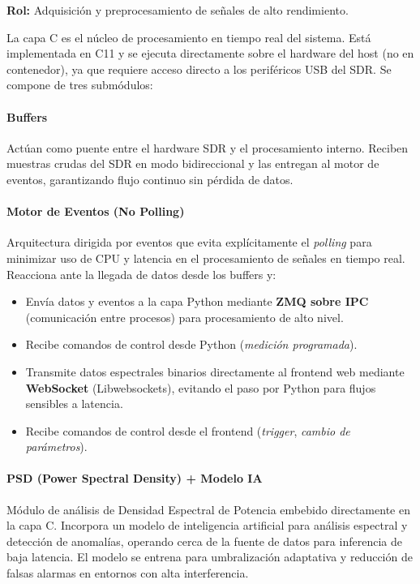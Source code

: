 \documentclass[12pt,a4paper]{article}
\begin{document}
\textbf{Rol:} Adquisición y preprocesamiento de señales de alto rendimiento.

La capa C es el núcleo de procesamiento en tiempo real del sistema. Está implementada en C11 y se ejecuta directamente sobre el hardware del host (no en contenedor), ya que requiere acceso directo a los periféricos USB del SDR. Se compone de tres submódulos:

\paragraph{Buffers}
Actúan como puente entre el hardware SDR y el procesamiento interno. Reciben muestras crudas del SDR en modo bidireccional y las entregan al motor de eventos, garantizando flujo continuo sin pérdida de datos.

\paragraph{Motor de Eventos (No Polling)}
Arquitectura dirigida por eventos que evita explícitamente el \textit{polling} para minimizar uso de CPU y latencia en el procesamiento de señales en tiempo real. Reacciona ante la llegada de datos desde los buffers y:
\begin{itemize}
  \item Envía datos y eventos a la capa Python mediante \textbf{ZMQ sobre IPC} (comunicación entre procesos) para procesamiento de alto nivel.
  \item Recibe comandos de control desde Python (\textit{medición programada}).
  \item Transmite datos espectrales binarios directamente al frontend web mediante \textbf{WebSocket} (Libwebsockets), evitando el paso por Python para flujos sensibles a latencia.
  \item Recibe comandos de control desde el frontend (\textit{trigger}, \textit{cambio de parámetros}).
\end{itemize}

\paragraph{PSD (Power Spectral Density) + Modelo IA}
Módulo de análisis de Densidad Espectral de Potencia embebido directamente en la capa C. Incorpora un modelo de inteligencia artificial para análisis espectral y detección de anomalías, operando cerca de la fuente de datos para inferencia de baja latencia. El modelo se entrena para umbralización adaptativa y reducción de falsas alarmas en entornos con alta interferencia.
\end{document}

